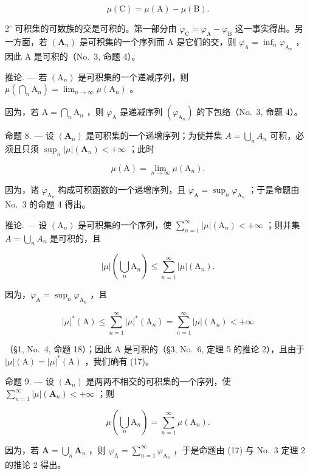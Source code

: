 \[
\mu (\mathrm{C}) = \mu (\mathrm{A}) - \mu (\mathrm{B}).\tag{15}
\]

\(2^{\circ}\) 可积集的可数族的交是可积的。第一部分由 \(\varphi_{\mathrm{C}} = \varphi_{\mathrm{A}} - \varphi_{\mathrm{B}}\) 这一事实得出。另一方面，若 \((\mathbf{A}_n)\) 是可积集的一个序列而 A 是它们的交，则 \(\varphi_{\mathrm{A}} = \inf_{n} \varphi_{\mathrm{A}_n}\) ，因此 A 是可积的（No.~3, 命题 4）。

推论. --- 若 \((\mathrm{A}_{n})\) 是可积集的一个递减序列，则 \(\mu(\bigcap_{n}\mathrm{A}_{n})=\lim_{n\to\infty}\mu(\mathrm{A}_{n})\) 。

因为，若 \(\mathrm{A} = \bigcap_{n}\mathrm{A}_{n}\) ，则 \(\varphi_{\mathrm{A}}\) 是递减序列 \((\varphi_{\mathrm{A}_n})\) 的下包络（No.~3, 命题 4）。

命题 8. --- 设 \((\mathbf{A}_{n})\) 是可积集的一个递增序列；为使并集 \(A = \bigcup_{n} A_{n}\) 可积，必须且只须 \(\sup_{n} |\mu|(\mathbf{A}_{n}) < +\infty\) ；此时

\[
\mu (\mathrm{A}) = \lim _ {n \rightarrow \infty} \mu (\mathrm{A} _ {n}).\tag{16}
\]

因为，诸 \(\varphi_{\mathrm{A}_n}\) 构成可积函数的一个递增序列，且 \(\varphi_{\mathrm{A}} = \sup_n \varphi_{\mathrm{A}_n}\) ；于是命题由 No.~3 的命题 4 得出。

推论. --- 设 \((\mathrm{A}_{n})\) 是可积集的一个序列，使 \(\sum_{n=1}^{\infty} |\mu|(\mathrm{A}_{n}) < +\infty\) ；则并集 \(A = \bigcup_{n} A_{n}\) 是可积的，且

\[
| \mu | \left(\bigcup_ {n} \mathrm{A} _ {n}\right) \leqslant \sum_ {n = 1} ^ {\infty} | \mu | (\mathrm{A} _ {n}).\tag{17}
\]

因为，\(\varphi_{\mathrm{A}} = \sup_n\varphi_{\mathrm{A}_n}\) ，且

\[
| \mu | ^ {*} (\mathrm{A}) \leqslant \sum_ {n = 1} ^ {\infty} | \mu | ^ {*} (\mathrm{A} _ {n}) = \sum_ {n = 1} ^ {\infty} | \mu | (\mathrm{A} _ {n}) <   + \infty
\]

（§1, No.~4, 命题 18）；因此 A 是可积的（§3, No.~6, 定理 5 的推论 2），且由于 \(|\mu|(\mathrm{A}) = |\mu|^*(\mathrm{A})\) ，我们确有 (17)。

命题 9. --- 设 \((\mathbf{A}_{n})\) 是两两不相交的可积集的一个序列，使 \(\sum_{n=1}^{\infty}|\mu|(\mathbf{A}_{n})<+\infty\) ；则

\[
\mu \left(\bigcup_ {n} \mathrm{A} _ {n}\right) = \sum_ {n = 1} ^ {\infty} \mu (\mathrm{A} _ {n}).\tag{18}
\]

因为，若 \(\mathbf{A} = \bigcup_{n}\mathbf{A}_{n}\) ，则 \(\varphi_{\mathrm{A}} = \sum_{n = 1}^{\infty}\varphi_{\mathrm{A}_n}\) ，于是命题由 (17) 与 No.~3 定理 2 的推论 2 得出。

